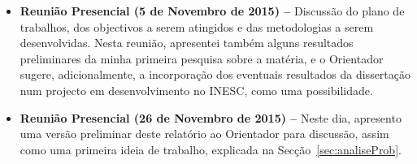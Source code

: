 \documentclass[a4paper, onecolumn, 10pt]{article}
\begin{document}
\begin{itemize}
		\item
			\textbf{Reunião Presencial (5 de Novembro de 2015) --} Discussão do plano de trabalhos, dos objectivos a serem atingidos e das metodologias a serem desenvolvidas. Nesta reunião, apresentei também alguns resultados preliminares da minha primeira pesquisa sobre a matéria, e o Orientador sugere, adicionalmente, a incorporação dos eventuais resultados da dissertação num projecto em desenvolvimento no INESC, como uma possibilidade.

		\item
			\textbf{Reunião Presencial (26 de Novembro de 2015) --} Neste dia, apresento uma versão preliminar deste relatório ao Orientador para discussão, assim como uma primeira ideia de trabalho, explicada na Secção~\ref{sec:analiseProb}.
	\end{itemize}
\end{document}
